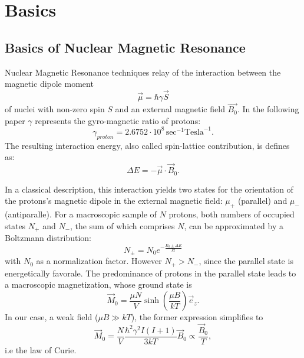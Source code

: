 \section{Basics}
\subsection{Basics of Nuclear Magnetic Resonance}

Nuclear Magnetic Resonance techniques relay of the interaction between the magnetic dipole moment
\begin{equation}
\label{magnetic dipole moment}
\vec{\mu} = \hbar\gamma\vec{S} 
\end{equation}
 of nuclei with non-zero spin $S$ and an external magnetic field $\vec{B_0}$. In the following paper $\gamma$ represents the gyro-magnetic ratio of protons:
 \begin{equation}
 \label{gamma proton}
 \gamma_{proton} = 2.6752 \cdot 10^8 \, \textrm{sec}^{-1}\textrm{Tesla}^{-1}.
 \end{equation}
The resulting interaction energy, also called spin-lattice contribution, is defines as:
\begin{equation}
\label{interaction energy}
\Delta E = -\vec{\mu}\cdot\vec{B}_0.
\end{equation}

In a classical description, this interaction yields two states for the orientation of the protons's magnetic dipole in the external magnetic field: $\mu_+$ (parallel) and $\mu_-$ (antiparalle).
For a macroscopic sample of $N$ protons, both numbers of occupied states $N_+$ and $N_-$, the sum of which comprises $N$, can be approximated by a Boltzmann distribution:
\begin{equation}
\label{ocupation number}
 N_\pm = N_0e^{-\frac{E_0\pm\Delta E}{kt}}
\end{equation}
with $N_0$ as a normalization factor. However $N_+ > N_-$, since the parallel state is energetically favorale. The predominance of protons in the parallel state leads to a macroscopic magnetization, whose ground state is
\begin{equation}
\label{magnetization ground state}
\vec{M}_0 = \frac{\mu N}{V}\sinh{\left(\frac{\mu B}{kT}\right)} \vec{e}_z .
\end{equation}
In our case, a weak field ($\mu B \gg kT$), the former expression simplifies to
\begin{equation}
\label{ground state approx}
\vec{M}_0 = \frac{N}{V} \frac{\hbar^2 \gamma^2 I(I+1)}{3kT}\vec{B}_0 \propto \frac{\vec{B}_0}{T},
\end{equation}
i.e the law of Curie.

